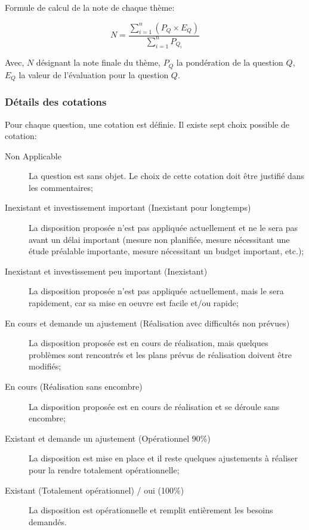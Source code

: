 Formule de calcul de la note de chaque thème:

$$ N=\frac{\sum_{i=1}^{n}{\left( P_Q \times E_Q \right)}}{\sum_{i=1}^{n}{P_{Q_i}}} $$

Avec, \textbf{$N$} désignant la note finale du thème, \textbf{$P_Q$} la pondération de la question \textbf{$Q$}, \textbf{$E_Q$} la valeur de l'évaluation pour la question \textbf{$Q$}.

\subsubsection{Détails des cotations}

Pour chaque question, une cotation est définie. Il existe sept choix possible de cotation:

\begin{description}
	\item[Non Applicable] La question est sans objet. Le choix de cette cotation doit être justifié dans les commentaires;
	\item[Inexistant et investissement important (Inexistant pour longtemps)] La disposition proposée n’est pas appliquée actuellement et ne le sera pas avant un délai important (mesure non planifiée, mesure nécessitant une étude préalable importante, mesure nécessitant un budget important, etc.);
	\item[Inexistant et investissement peu important (Inexistant)] La disposition proposée n’est pas appliquée actuellement, mais le sera rapidement, car sa mise en oeuvre est facile et/ou rapide;
	\item[En cours et demande un ajustement (Réalisation avec difficultés non prévues)] La disposition proposée est en cours de réalisation, mais quelques problèmes sont rencontrés et les plans prévus de réalisation doivent être modifiés;
	\item[En cours (Réalisation sans encombre)] La disposition proposée est en cours de réalisation et se déroule sans encombre;
	\item[Existant et demande un ajustement (Opérationnel 90\%)] La disposition est mise en place et il reste quelques ajustements à réaliser pour la rendre totalement opérationnelle;
	\item[Existant (Totalement opérationnel) / oui (100\%)] La disposition est opérationnelle et remplit entièrement les besoins demandés.
 \end{description}
